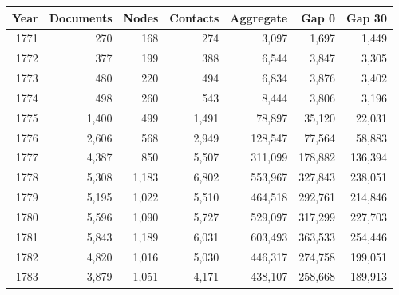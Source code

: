 \begin{tabular}{rrrrrrr}\toprule Year&Documents&Nodes&Contacts&Aggregate&Gap 0&Gap 30\\\midrule
1771&270&168&274&3,097&1,697&1,449\\
1772&377&199&388&6,544&3,847&3,305\\
1773&480&220&494&6,834&3,876&3,402\\
1774&498&260&543&8,444&3,806&3,196\\
1775&1,400&499&1,491&78,897&35,120&22,031\\
1776&2,606&568&2,949&128,547&77,564&58,883\\
1777&4,387&850&5,507&311,099&178,882&136,394\\
1778&5,308&1,183&6,802&553,967&327,843&238,051\\
1779&5,195&1,022&5,510&464,518&292,761&214,846\\
1780&5,596&1,090&5,727&529,097&317,299&227,703\\
1781&5,843&1,189&6,031&603,493&363,533&254,446\\
1782&4,820&1,016&5,030&446,317&274,758&199,051\\
1783&3,879&1,051&4,171&438,107&258,668&189,913\\
\bottomrule\end{tabular}